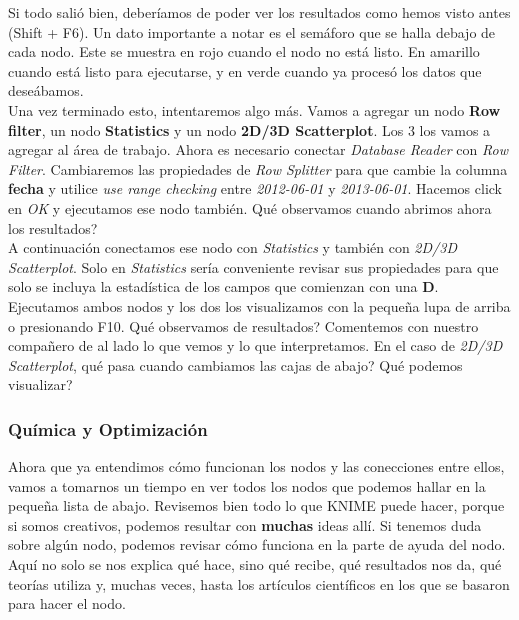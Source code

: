 \documentclass[10pt,letterpaper]{article}
\begin{document}
Si todo sali\'o bien, deber\'iamos de poder ver los resultados como hemos visto antes (Shift + F6). Un dato importante a notar es el sem\'aforo que se halla debajo de cada nodo. Este se muestra en rojo cuando el nodo no est\'a listo. En amarillo cuando est\'a listo para ejecutarse, y en verde cuando ya proces\'o los datos que dese\'abamos.\\

Una vez terminado esto, intentaremos algo m\'as. Vamos a agregar un nodo \textbf{Row filter}, un nodo \textbf{Statistics} y un nodo \textbf{2D/3D Scatterplot}. Los 3 los vamos a agregar al \'area de trabajo. Ahora es necesario conectar \emph{Database Reader} con \emph{Row Filter}. Cambiaremos las propiedades de \emph{Row Splitter} para que cambie la columna \textbf{fecha} y utilice \emph{use range checking} entre \emph{2012-06-01} y \emph{2013-06-01}. Hacemos click en \emph{OK} y ejecutamos ese nodo tambi\'en. Qu\'e observamos cuando abrimos ahora los resultados?\\

A continuaci\'on conectamos ese nodo con \emph{Statistics} y tambi\'en con \emph{2D/3D Scatterplot}. Solo en \emph{Statistics} ser\'ia conveniente revisar sus propiedades para que solo se incluya la estad\'istica de los campos que comienzan con una \textbf{D}. Ejecutamos ambos nodos y los dos los visualizamos con la peque\~na lupa de arriba o presionando F10. Qu\'e observamos de resultados? Comentemos con nuestro compa\~nero de al lado lo que vemos y lo que interpretamos. En el caso de \emph{2D/3D Scatterplot}, qu\'e pasa cuando cambiamos las cajas de abajo? Qu\'e podemos visualizar?

\subsubsection{Qu\'imica y Optimizaci\'on}
Ahora que ya entendimos c\'omo funcionan los nodos y las conecciones entre ellos, vamos a tomarnos un tiempo en ver todos los nodos que podemos hallar en la peque\~na lista de abajo. Revisemos bien todo lo que KNIME puede hacer, porque si somos creativos, podemos resultar con \textbf{muchas} ideas all\'i. Si tenemos duda sobre alg\'un nodo, podemos revisar c\'omo funciona en la parte de ayuda del nodo. Aqu\'i no solo se nos explica qu\'e hace, sino qu\'e recibe, qu\'e resultados nos da, qu\'e teor\'ias utiliza y, muchas veces, hasta los art\'iculos cient\'ificos en los que se basaron para hacer el nodo.\\
\end{document}
